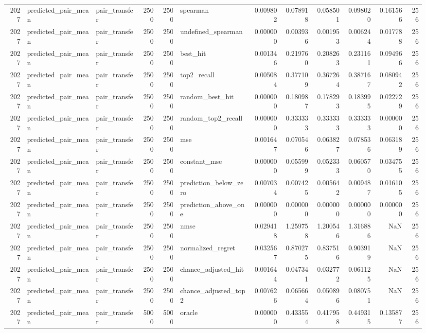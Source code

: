 \begin{tabular}{rllrrlrrrrrr}
2027 & predicted_pair_mean & pair_transfer & 2500 & 2500 & spearman & 0.009802 & 0.078918 & 0.058501 & 0.098020 & 0.161566 & 256 \\
2027 & predicted_pair_mean & pair_transfer & 2500 & 2500 & undefined_spearman & 0.000000 & 0.003936 & 0.001953 & 0.006244 & 0.017788 & 256 \\
2027 & predicted_pair_mean & pair_transfer & 2500 & 2500 & best_hit & 0.001346 & 0.219760 & 0.208263 & 0.231161 & 0.094966 & 256 \\
2027 & predicted_pair_mean & pair_transfer & 2500 & 2500 & top2_recall & 0.005084 & 0.377109 & 0.367264 & 0.387167 & 0.080942 & 256 \\
2027 & predicted_pair_mean & pair_transfer & 2500 & 2500 & random_best_hit & 0.000000 & 0.180987 & 0.178293 & 0.183995 & 0.022729 & 256 \\
2027 & predicted_pair_mean & pair_transfer & 2500 & 2500 & random_top2_recall & 0.000000 & 0.333333 & 0.333333 & 0.333333 & 0.000000 & 256 \\
2027 & predicted_pair_mean & pair_transfer & 2500 & 2500 & mse & 0.001647 & 0.070546 & 0.063827 & 0.078536 & 0.063189 & 256 \\
2027 & predicted_pair_mean & pair_transfer & 2500 & 2500 & constant_mse & 0.000000 & 0.055999 & 0.052333 & 0.060570 & 0.034755 & 256 \\
2027 & predicted_pair_mean & pair_transfer & 2500 & 2500 & prediction_below_zero & 0.007034 & 0.007425 & 0.005642 & 0.009487 & 0.016105 & 256 \\
2027 & predicted_pair_mean & pair_transfer & 2500 & 2500 & prediction_above_one & 0.000000 & 0.000000 & 0.000000 & 0.000000 & 0.000000 & 256 \\
2027 & predicted_pair_mean & pair_transfer & 2500 & 2500 & nmse & 0.029418 & 1.259758 & 1.200546 & 1.316886 & NaN & 256 \\
2027 & predicted_pair_mean & pair_transfer & 2500 & 2500 & normalized_regret & 0.032567 & 0.870275 & 0.837516 & 0.903919 & NaN & 256 \\
2027 & predicted_pair_mean & pair_transfer & 2500 & 2500 & chance_adjusted_hit & 0.001644 & 0.047341 & 0.032772 & 0.061125 & NaN & 256 \\
2027 & predicted_pair_mean & pair_transfer & 2500 & 2500 & chance_adjusted_top2 & 0.007626 & 0.065664 & 0.050896 & 0.080751 & NaN & 256 \\
2027 & predicted_pair_mean & pair_transfer & 5000 & 5000 & oracle & 0.000000 & 0.433554 & 0.417958 & 0.449315 & 0.135877 & 256 \\

\end{tabular}
